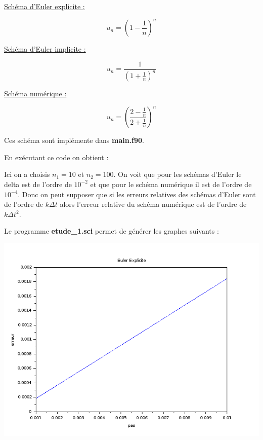 \documentclass[12pt, letterpaper]{article}
\begin{document}
\begin{enumerate}
  \underline{Schéma d'Euler explicite :}

  \begin{equation*}
    u_n = \left( 1 - \frac{1}{n} \right)^n
  \end{equation*}

  \underline{Schéma d'Euler implicite :}

  \begin{equation*}
    u_n = \frac{1}{\left( 1 + \frac{1}{n} \right)^n}
  \end{equation*}

  \underline{Schéma numérique :}

  \begin{equation*}
    u_n = \left( \frac{2 - \frac{1}{n}}{2 + \frac{1}{n}} \right)^n
  \end{equation*}

  Ces schéma sont implémente dans \textbf{main.f90}.

  \newpage

  

  En exécutant ce code on obtient :

  

  Ici on a choisis $n_1 = 10$ et $n_2 = 100$. On voit que pour les
  schémas d'Euler le delta est de l'ordre de $10^{-2}$ et que pour le
  schéma numérique il est de l'ordre de $10^{-4}$.\newline
  Donc on peut supposer que si les erreurs relatives des schémas
  d'Euler sont de l'ordre de $k \Delta t$ alors l'erreur relative du
  schéma numérique est de l'ordre de $k \Delta t^2$.


  Le programme \textbf{etude\_1.sci} permet de générer les graphes
  suivants :

  \includegraphics[scale = 0.6]{img/etude_1_ee.png}


\end{enumerate}
\end{document}

